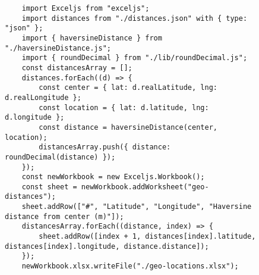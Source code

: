 \label{apendix:script-exceljs}
\begin{figure}[H]
    \begin{verbatim}
    import Exceljs from "exceljs";
    import distances from "./distances.json" with { type: "json" };
    import { haversineDistance } from "./haversineDistance.js";
    import { roundDecimal } from "./lib/roundDecimal.js";
    const distancesArray = [];
    distances.forEach((d) => {
        const center = { lat: d.realLatitude, lng: d.realLongitude };
        const location = { lat: d.latitude, lng: d.longitude };
        const distance = haversineDistance(center, location);
        distancesArray.push({ distance: roundDecimal(distance) });
    });
    const newWorkbook = new Exceljs.Workbook();
    const sheet = newWorkbook.addWorksheet("geo-distances");
    sheet.addRow(["#", "Latitude", "Longitude", "Haversine distance from center (m)"]);
    distancesArray.forEach((distance, index) => {
        sheet.addRow([index + 1, distances[index].latitude, distances[index].longitude, distance.distance]);
    });
    newWorkbook.xlsx.writeFile("./geo-locations.xlsx");
    \end{verbatim}
\end{figure}

